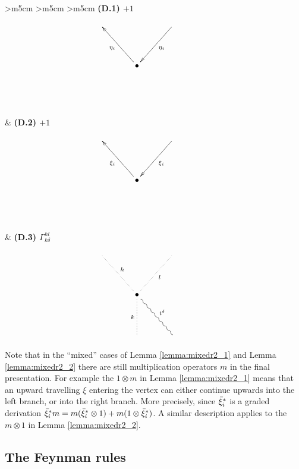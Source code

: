 \documentclass[english,letter paper,12pt,leqno]{article}
\theoremstyle{example}
\numberwithin{equation}{section}
\begin{document}
\begin{center}
\begin{tabular}{ >{\centering}m{5cm} >{\centering}m{5cm} >{\centering}m{5cm} }
\textbf{(D.1) $+1$}
\vspace{0.1cm}
\[
\xymatrix@C+1pc@R+1.5pc{
& & \ar[dl]^-{\eta_i} \\
& \bullet \ar[ul]^-{\eta_i}\\
& & &
}
\]
&
\textbf{(D.2) $+1$}
\vspace{0.1cm}
\[
\xymatrix@C+1pc@R+1.5pc{
& & \ar[dl]^-{\xi_i} \\
& \bullet \ar[ul]^-{\xi_i}\\
& & &
}
\]
&
\textbf{(D.3) $\Gamma^{hl}_{k\delta}$}
\vspace{0.1cm}
\[
\xymatrix@C+1pc@R+1.5pc{
\ar@{.}[dr]^-{h} & & \ar@{.}[dl]^-{l}\\
& \bullet \ar@{.}[d]_-{k} \ar@{~}[dr]^-{t^\delta}\\
& & &
}
\]
\end{tabular}
\end{center}

Note that in the ``mixed'' cases of Lemma \ref{lemma:mixedr2_1} and Lemma \ref{lemma:mixedr2_2} there are still multiplication operators $m$ in the final presentation. For example the $1 \otimes m$ in Lemma \ref{lemma:mixedr2_1} means that an upward travelling $\xi$ entering the vertex can either continue upwards into the left branch, or into the right branch. More precisely, since $\Bar{\xi}_i^*$ is a graded derivation $\Bar{\xi}_i^* m = m (\Bar{\xi}_i^* \otimes 1) + m( 1 \otimes \Bar{\xi}_i^* )$. A similar description applies to the $m \otimes 1$ in Lemma \ref{lemma:mixedr2_2}. 

\subsection{The Feynman rules}\label{section:feynman_diagram_4}
\end{document}
